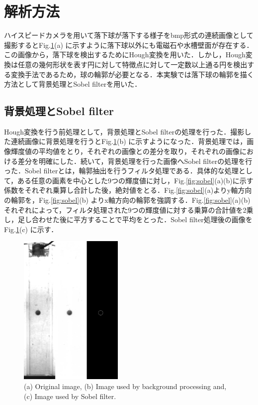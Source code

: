 \section{解析方法}
ハイスピードカメラを用いて落下球が落下する様子をbmp形式の連続画像として撮影するとFig.\ref{fig:expPhoto}(a) に示すように落下球以外にも電磁石や水槽壁面が存在する．この画像から，落下球を検出するためにHough変換を用いた．しかし，Hough変換は任意の幾何形状を表す円に対して特徴点に対して一定数以上通る円を検出する変換手法であるため，球の輪郭が必要となる．本実験では落下球の輪郭を描く方法として背景処理とSobel filterを用いた．
\subsection{背景処理とSobel filter}
Hough変換を行う前処理として，背景処理とSobel filterの処理を行った．撮影した連続画像に背景処理を行うとFig.\ref{fig:expPhoto}(b) に示すようになった．背景処理では，画像輝度値の平均値をとり，それぞれの画像との差分を取り，それぞれの画像における差分を明確にした．続いて，背景処理を行った画像へSobel filterの処理を行った．Sobel filterとは，輪郭抽出を行うフィルタ処理である．具体的な処理として，ある任意の画素を中心とした9つの輝度値に対し，Fig.\ref{fig:sobel}(a)(b)に示す係数をそれぞれ乗算し合計した後，絶対値をとる．Fig.\ref{fig:sobel}(a)よりy軸方向の輪郭を，Fig.\ref{fig:sobel}(b) よりx軸方向の輪郭を強調する．Fig.\ref{fig:sobel}(a)(b)それぞれによって，フィルタ処理された9つの輝度値に対する乗算の合計値を2乗し，足し合わせた後に平方することで平均をとった．Sobel filter処理後の画像をFig.\ref{fig:expPhoto}(c) に示す．

\begin{figure}[h]
    \centering
    \includegraphics[width=5.0cm,clip]{3-Analysis/exp-img.png}
    \caption{(a) Original image, (b) Image used by background processing and, (c) Image used by Sobel filter.}
    \label{fig:expPhoto}
\end{figure}

